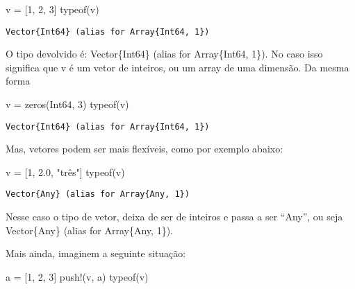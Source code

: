 \documentclass[
  letterpaper,
  DIV=11,
  numbers=noendperiod]{scrreprt}
\newenvironment{Shaded}{\begin{snugshade}}{\end{snugshade}}
\newcommand{\DataTypeTok}[1]{\textcolor[rgb]{0.68,0.00,0.00}{#1}}
\newcommand{\FloatTok}[1]{\textcolor[rgb]{0.68,0.00,0.00}{#1}}
\newcommand{\FunctionTok}[1]{\textcolor[rgb]{0.28,0.35,0.67}{#1}}
\newcommand{\NormalTok}[1]{\textcolor[rgb]{0.00,0.23,0.31}{#1}}
\newcommand{\OperatorTok}[1]{\textcolor[rgb]{0.37,0.37,0.37}{#1}}
\newcommand{\StringTok}[1]{\textcolor[rgb]{0.13,0.47,0.30}{#1}}
\begin{document}
\begin{Shaded}
\begin{Highlighting}[]
\NormalTok{v }\OperatorTok{=}\NormalTok{ [}\FloatTok{1}\NormalTok{, }\FloatTok{2}\NormalTok{, }\FloatTok{3}\NormalTok{]}
\FunctionTok{typeof}\NormalTok{(v)}
\end{Highlighting}
\end{Shaded}

\begin{verbatim}
Vector{Int64} (alias for Array{Int64, 1})
\end{verbatim}

O tipo devolvido é: Vector\{Int64\} (alias for Array\{Int64, 1\}). No
caso isso significa que v é um vetor de inteiros, ou um array de uma
dimensão. Da mesma forma

\begin{Shaded}
\begin{Highlighting}[]
\NormalTok{v }\OperatorTok{=} \FunctionTok{zeros}\NormalTok{(}\DataTypeTok{Int64}\NormalTok{, }\FloatTok{3}\NormalTok{)}
\FunctionTok{typeof}\NormalTok{(v)}
\end{Highlighting}
\end{Shaded}

\begin{verbatim}
Vector{Int64} (alias for Array{Int64, 1})
\end{verbatim}

Mas, vetores podem ser mais flexíveis, como por exemplo abaixo:

\begin{Shaded}
\begin{Highlighting}[]
\NormalTok{v }\OperatorTok{=}\NormalTok{ [}\FloatTok{1}\NormalTok{, }\FloatTok{2.0}\NormalTok{, }\StringTok{"três"}\NormalTok{]}
\FunctionTok{typeof}\NormalTok{(v)}
\end{Highlighting}
\end{Shaded}

\begin{verbatim}
Vector{Any} (alias for Array{Any, 1})
\end{verbatim}

Nesse caso o tipo de vetor, deixa de ser de inteiros e passa a ser
``Any'', ou seja Vector\{Any\} (alias for Array\{Any, 1\}).

Mais ainda, imaginem a seguinte situação:

\begin{Shaded}
\begin{Highlighting}[]
\NormalTok{a }\OperatorTok{=}\NormalTok{ [}\FloatTok{1}\NormalTok{, }\FloatTok{2}\NormalTok{, }\FloatTok{3}\NormalTok{]}
\FunctionTok{push!}\NormalTok{(v, a)}
\FunctionTok{typeof}\NormalTok{(v)}
\end{Highlighting}
\end{Shaded}
\end{document}
